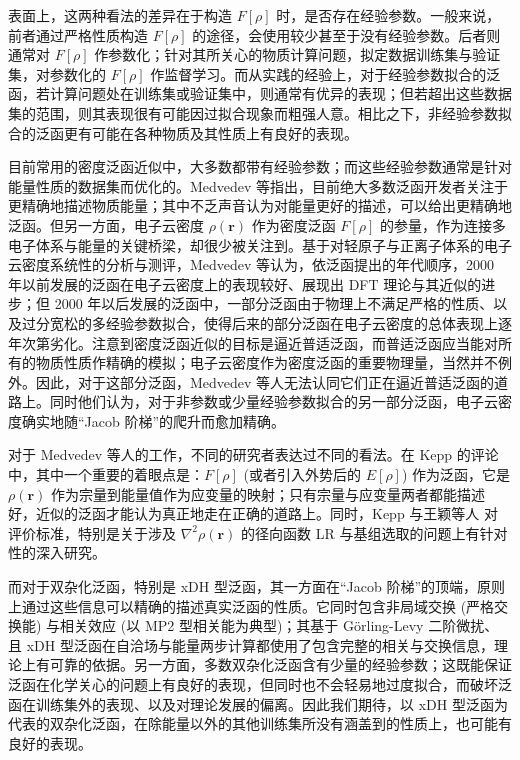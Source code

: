 表面上，这两种看法的差异在于构造 $F[\rho]$ 时，是否存在经验参数。一般来说，前者通过严格性质构造 $F[\rho]$ 的途径，会使用较少甚至于没有经验参数。后者则通常对 $F[\rho]$ 作参数化；针对其所关心的物质计算问题，拟定数据训练集与验证集，对参数化的 $F[\rho]$ 作监督学习。而从实践的经验上，对于经验参数拟合的泛函，若计算问题处在训练集或验证集中，则通常有优异的表现；但若超出这些数据集的范围，则其表现很有可能因过拟合现象而粗强人意。相比之下，非经验参数拟合的泛函更有可能在各种物质及其性质上有良好的表现。

目前常用的密度泛函近似中，大多数都带有经验参数；而这些经验参数通常是针对能量性质的数据集而优化的。Medvedev 等\cite{Medvedev-Lyssenko.S.2017}指出，目前绝大多数泛函开发者关注于更精确地描述物质能量；其中不乏声音认为对能量更好的描述，可以给出更精确地泛函。但另一方面，电子云密度 $\rho(\bm{r})$ 作为密度泛函 $F[\rho]$ 的参量，作为连接多电子体系与能量的关键桥梁，却很少被关注到。基于对轻原子与正离子体系的电子云密度系统性的分析与测评，Medvedev 等认为，依泛函提出的年代顺序，2000 年以前发展的泛函在电子云密度上的表现较好、展现出 DFT 理论与其近似的进步；但 2000 年以后发展的泛函中，一部分泛函由于物理上不满足严格的性质、以及过分宽松的多经验参数拟合，使得后来的部分泛函在电子云密度的总体表现上逐年次第劣化。注意到密度泛函近似的目标是逼近普适泛函，而普适泛函应当能对所有的物质性质作精确的模拟；电子云密度作为密度泛函的重要物理量，当然并不例外。因此，对于这部分泛函，Medvedev 等人无法认同它们正在逼近普适泛函的道路上。同时他们认为，对于非参数或少量经验参数拟合的另一部分泛函，电子云密度确实地随“Jacob 阶梯”\cite{Perdew-Schmidt.ACP.2001}的爬升而愈加精确。

对于 Medvedev 等人的工作，不同的研究者表达过不同的看法。在 Kepp 的评论\cite{Kepp-Kepp.S.2017}中，其中一个重要的着眼点是：$F[\rho]$ (或者引入外势后的 $E[\rho]$) 作为泛函，它是 $\rho(\bm{r})$ 作为宗量到能量值作为应变量的映射；只有宗量与应变量两者都能描述好，近似的泛函才能认为真正地走在正确的道路上。同时，Kepp\cite{Kepp-Kepp.S.2017} 与王颖等人\cite{Wang-He.JCTC.2017} 对评价标准，特别是关于涉及 $\nabla^2 \rho(\bm{r})$ 的径向函数 LR 与基组选取的问题上有针对性的深入研究。

而对于双杂化泛函，特别是 xDH 型泛函\cite{Zhang-Goddard.PNAS.2009}，其一方面在“Jacob 阶梯”的顶端，原则上通过这些信息可以精确的描述真实泛函的性质。它同时包含非局域交换 (严格交换能) 与相关效应 (以 MP2 型相关能为典型)；其基于 G\"orling-Levy 二阶微扰\cite{Goerling-Levy.PRB.1993, Goerling-Levy.PRA.1994}、且 xDH 型泛函在自洽场与能量两步计算都使用了包含完整的相关与交换信息，理论上有可靠的依据。另一方面，多数双杂化泛函含有少量的经验参数；这既能保证泛函在化学关心的问题上有良好的表现，但同时也不会轻易地过度拟合，而破坏泛函在训练集外的表现、以及对理论发展的偏离。因此我们期待，以 xDH 型泛函为代表的双杂化泛函，在除能量以外的其他训练集所没有涵盖到的性质上，也可能有良好的表现。

